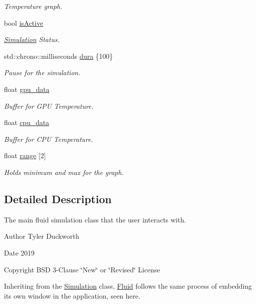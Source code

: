 \begin{DoxyCompactItemize}
\begin{DoxyCompactList}\small\item\em Temperature graph. \end{DoxyCompactList}\item 
bool \mbox{\hyperlink{classFluid_aea07a907844eca27a318311869d31473}{is\+Active}}
\begin{DoxyCompactList}\small\item\em \mbox{\hyperlink{classSimulation}{Simulation}} Status. \end{DoxyCompactList}\item 
std\+::chrono\+::milliseconds \mbox{\hyperlink{classFluid_ab90bfd8344aa2e4cbebda5eee86dcf62}{dura}} \{100\}
\begin{DoxyCompactList}\small\item\em Pause for the simulation. \end{DoxyCompactList}\item 
float \mbox{\hyperlink{classFluid_ad3e877e95bce8f5f779cb87810c39550}{gpu\+\_\+data}}
\begin{DoxyCompactList}\small\item\em Buffer for G\+PU Temperature. \end{DoxyCompactList}\item 
float \mbox{\hyperlink{classFluid_a596fd99b82b4553495b12f353488848e}{cpu\+\_\+data}}
\begin{DoxyCompactList}\small\item\em Buffer for C\+PU Temperature. \end{DoxyCompactList}\item 
float \mbox{\hyperlink{classFluid_a68eb81a3476d8aef975f151e209fe317}{range}} \mbox{[}2\mbox{]}
\begin{DoxyCompactList}\small\item\em Holds minimum and max for the graph. \end{DoxyCompactList}\end{DoxyCompactItemize}


\subsection{Detailed Description}
The main fluid simulation class that the user interacts with. 

\begin{DoxyAuthor}{Author}
Tyler Duckworth 
\end{DoxyAuthor}
\begin{DoxyDate}{Date}
2019 
\end{DoxyDate}
\begin{DoxyCopyright}{Copyright}
B\+SD 3-\/Clause \char`\"{}\+New\char`\"{} or \char`\"{}\+Revised\char`\"{} License
\end{DoxyCopyright}
Inheriting from the \mbox{\hyperlink{classSimulation}{Simulation}} class, \mbox{\hyperlink{classFluid}{Fluid}} follows the same process of embedding its own window in the application, seen here. 

